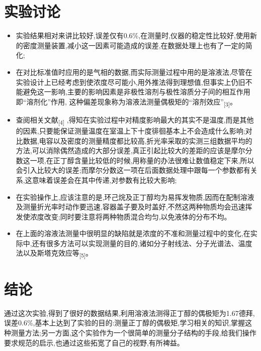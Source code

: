 \documentclass[11pt]{report}
\begin{document}
\section{实验讨论}
\label{sec:org157eddd}
\begin{itemize}
\item 实验结果相对来讲比较好,误差仅有0.6\%,在测量时,仪器的稳定性比较好,使用新的密度测量装置,减小这一因素可能造成的误差,在数据处理上也有了一定的简化;
\item 在对比标准值时应用的是气相的数据,而实际测量过程中用的是溶液法,尽管在实验设计上已经考虑到使浓度尽可能小,用外推法得到理想值,但事实上仍旧不能避免这一影响,主要的影响因素是非极性溶剂与极性溶质分子间的相互作用即“溶剂化”作用, 这种偏差现象称为溶液法测量偶极矩的“溶剂效应”\textsubscript{[3]}。
\item 查阅相关文献\textsubscript{[4]} ,得知在实验过程中对精度影响最大的其实不是温度,而是其他的因素,只要能保证测量温度在室温上下十度徘徊基本上不会造成什么影响;对比数据,电容以及密度的测量精度都比较高,折光率采取的实测三组数据平均的方法,可以消除偶然造成的大部分误差,真正引起比较大的差距的应该是摩尔分数这一项,在正丁醇含量比较低的时候,用称量的办法很难让数值稳定下来,所以会引入比较大的误差;而摩尔分数这一项在后面数据处理中跟每一个参数都有关系,这意味着误差会在其中传递,对参数有比较大影响;
\item 在实验操作上,应该注意的是,环己烷及正丁醇均为易挥发物质,因而在配制溶液及测量折光率时动作要迅速,容器盖子要及时盖好,不然这两种物质均会迅速挥发使浓度改变;同时要注意将两种物质混合均匀,以免液体的分布不均。
\item 在上面的溶液法测量中很明显的缺陷就是浓度的不准和测量过程中的变化,在实际中,还有很多方法可以实现测量的目的,诸如分子射线法、分子光谱法、温度法以及斯塔克效应等\textsubscript{[5]}。
\end{itemize}
\section{结论}
\label{sec:orgff0b1ab}
通过这次实验,得到了很好的数据结果,利用溶液法测得正丁醇的偶极矩为1.67德拜,误差0.6\%,基本上达到了实验的目的:测量正丁醇的偶极矩,学习相关的知识,掌握这种测量方法;另一方面,这个实验作为一个很简单的测量分子结构的手段,给我们操作要求规范的启示,也通过这些拓宽了自己的视野,有所裨益。
\end{document}
